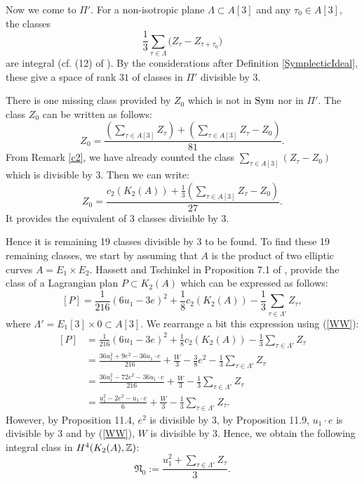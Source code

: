 Now we come to $\Pi'$. For a non-isotropic plane $\Lambda \subset A[3]$ and any $\tau_0\in A[3]$, the classes 
\begin{equation}
 \frac{1}{3}\sum_{\tau\in\Lambda} \Big(Z_{\tau} - Z_{\tau+\tau_0}\Big)
\end{equation}
are integral (cf. (12) of \cite{Hassett}). By the considerations after Definition \ref{SymplecticIdeal}, these give a space of rank $31$ of classes in $\Pi'$ divisible by $3$.

There is one missing class provided by $Z_0$ which is not in $\operatorname{Sym}$ nor in $\Pi'$.
The class $Z_0$ can be written as follows:
$$Z_0=\frac{(\sum_{\tau\in A[3]}Z_\tau)+(\sum_{\tau\in A[3]}Z_\tau-Z_0)}{81}.$$
From Remark \ref{c2}, we have already counted the class $\sum_{\tau\in A[3]}(Z_\tau-Z_0)$ which is divisible by 3. Then we can write:
$$Z_0=\frac{c_2(K_2(A))+\frac{1}{3}(\sum_{\tau\in A[3]}Z_\tau-Z_0)}{27}.$$
It provides the equivalent of 3 classes divisible by 3. 

Hence it is remaining 19 classes divisible by 3 to be found.
To find these 19 remaining classes, we start by assuming that $A$ is the product of two elliptic curves $A=E_1\times E_2$.
Hassett and Tschinkel in Proposition 7.1 of \cite{Hassett}, provide the class of a Lagrangian plan $P\subset K_2(A)$ which can be expressed as follows:
$$\left[P\right]=\frac{1}{216}(6u_1-3e)^2+\frac{1}{8}c_2(K_2(A))-\frac{1}{3}\sum_{\tau\in \Lambda'} Z_{\tau},$$
where $\Lambda'=E_1[3]\times 0\subset A[3]$. We rearrange a bit this expression using (\ref{WW}):
\begin{align*}
\left[P\right]&=\frac{1}{216}(6u_1-3e)^2+\frac{1}{8}c_2(K_2(A))-\frac{1}{3}\sum_{\tau\in \Lambda'} Z_{\tau}\\
&=\frac{36u_1^2+9e^2-36u_1\cdot e}{216} +\frac{W}{3}-\frac{3}{8}e^2-\frac{1}{3}\sum_{\tau\in \Lambda'} Z_{\tau}\\
&=\frac{36u_1^2-72e^2-36u_1\cdot e}{216} +\frac{W}{3}-\frac{1}{3}\sum_{\tau\in \Lambda'} Z_{\tau}\\
&=\frac{u_1^2-2e^2-u_1\cdot e}{6} +\frac{W}{3}-\frac{1}{3}\sum_{\tau\in \Lambda'} Z_{\tau}.
\end{align*}
However, by Proposition 11.4, $e^2$ is divisible by 3, by Proposition 11.9, $u_1\cdot e$ is divisible by 3 and by (\ref{WW}), $W$ is divisible by 3.
Hence, we obtain the following integral class in $H^{4}(K_2(A),\mathbb{Z})$:
$$\mathfrak{N}_0:=\frac{u_1^2+\sum_{\tau\in \Lambda'} Z_{\tau}}{3}.$$

